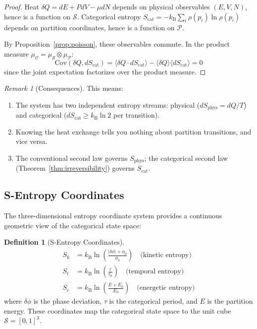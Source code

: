 \documentclass[twocolumn,10pt,a4paper]{article}
\theoremstyle{plain}
\theoremstyle{definition}
\newtheorem{definition}[theorem]{Definition}
\theoremstyle{remark}
\newtheorem{remark}[theorem]{Remark}
\newcommand{\kB}{k_{\mathrm{B}}}
\newcommand{\Partition}{\mathcal{P}}
\newcommand{\Cat}{\mathcal{C}}
\newcommand{\Sspace}{\mathcal{S}}
\begin{document}
\begin{proof}
Heat $\delta Q = dE + PdV - \mu dN$ depends on physical observables $(E, V, N)$, hence is a function on $\Sspace$. Categorical entropy $S_{\mathrm{cat}} = -\kB \sum_i \rho(p_i) \ln \rho(p_i)$ depends on partition coordinates, hence is a function on $\Partition$.

By Proposition~\ref{prop:poisson}, these observables commute. In the product measure $\mu_\Cat = \mu_\Sspace \otimes \mu_\Partition$:
\begin{equation}
    \mathrm{Cov}(\delta Q, dS_{\mathrm{cat}}) = \langle \delta Q \cdot dS_{\mathrm{cat}} \rangle - \langle \delta Q\rangle\langle dS_{\mathrm{cat}}\rangle = 0
\end{equation}
since the joint expectation factorizes over the product measure.
\end{proof}

\begin{remark}[Consequences]
This means:
\begin{enumerate}
    \item The system has two independent entropy streams: physical ($dS_{\mathrm{phys}} = dQ/T$) and categorical ($dS_{\mathrm{cat}} \geq \kB \ln 2$ per transition).
    \item Knowing the heat exchange tells you nothing about partition transitions, and vice versa.
    \item The conventional second law governs $S_{\mathrm{phys}}$; the categorical second law (Theorem~\ref{thm:irreversibility}) governs $S_{\mathrm{cat}}$.
\end{enumerate}
\end{remark}

\subsection{S-Entropy Coordinates}

The three-dimensional entropy coordinate system provides a continuous geometric view of the categorical state space:

\begin{definition}[S-Entropy Coordinates]
\label{def:s_coords}
\begin{align}
    S_k &= \kB \ln\!\left(\frac{|\delta\phi| + \phi_0}{\phi_0}\right) \quad \text{(kinetic entropy)} \\
    S_t &= \kB \ln\!\left(\frac{\tau}{\tau_0}\right) \quad \text{(temporal entropy)} \\
    S_e &= \kB \ln\!\left(\frac{E + E_0}{E_0}\right) \quad \text{(energetic entropy)}
\end{align}
where $\delta\phi$ is the phase deviation, $\tau$ is the categorical period, and $E$ is the partition energy. These coordinates map the categorical state space to the unit cube $\Sspace = [0,1]^3$.
\end{definition}
\end{document}
